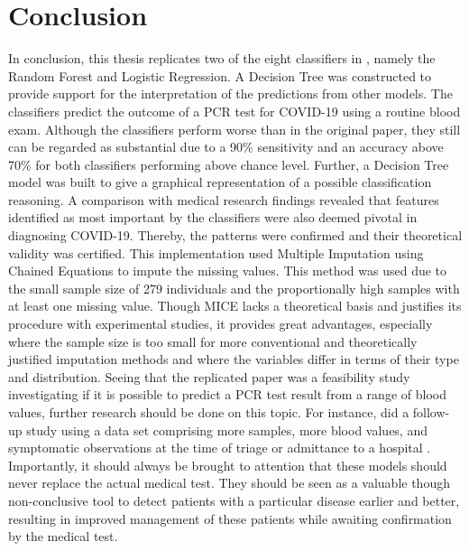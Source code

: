 \section{Conclusion}
In conclusion, this thesis replicates two of the eight classifiers in 
\cite{RN127}, namely the Random Forest and Logistic Regression. A Decision Tree 
was constructed to provide support for the interpretation of the predictions 
from other models. The classifiers predict the outcome of a PCR test for 
COVID-19 using a routine blood exam. Although the classifiers perform worse 
than in the 
original paper, they still can be regarded as substantial due to a 90\% 
sensitivity and an accuracy above 70\% for both classifiers performing above 
chance level.
Further, a Decision Tree model was built to give a graphical representation of 
a possible classification reasoning.
A comparison with medical research findings revealed that features 
identified as most important by the classifiers were also deemed pivotal in 
diagnosing COVID-19. Thereby, the patterns were confirmed and their theoretical 
validity was certified.
This implementation used Multiple Imputation using Chained Equations to impute 
the missing values. This method was used due to the small sample size of 279 
individuals and the proportionally high samples with at least one 
missing value. Though MICE lacks a theoretical basis and justifies its 
procedure with experimental studies, it provides great advantages, especially 
where the sample size is too small for more conventional and theoretically 
justified imputation methods and where the variables differ in terms of their 
type and distribution.
Seeing that the replicated paper was a feasibility study investigating if it is 
possible to predict a PCR test result from a range of blood values, further 
research should be done on this topic. For instance, \citeauthor{RN127} did a 
follow-up study using a data set comprising more samples, more blood values, 
and symptomatic observations at the time of triage or admittance to a hospital 
\cite{RN179}.
Importantly, it should always be brought to attention that these 
models should never replace the actual medical test. They should be seen as a 
valuable though non-conclusive tool to detect patients with a particular 
disease earlier and better, resulting in improved management of these patients 
while awaiting confirmation by the medical test.
